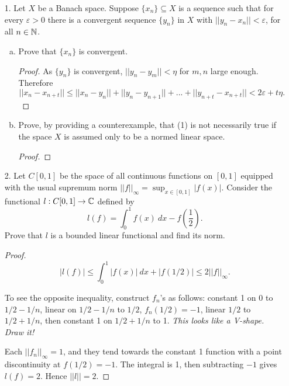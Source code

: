

\begin{itemize}

\item[1.] Let $X$ be a Banach space. Suppose $\{x_n\} \subseteq X$ is a sequence such that for every $\varepsilon > 0$ there is a convergent sequence $\{y_n\}$ in $X$ with $||y_n - x_n|| < \varepsilon$, for all $n \in \mathbb{N}$.
\begin{enumerate}[(a)]
\item Prove that $\{x_n\}$ is convergent.
\begin{proof}
As $\{y_n\}$ is convergent, $||y_n - y_m|| < \eta$ for $m,n$ large enough. Therefore
$$||x_n - x_{n+t}|| \leq ||x_n - y_n|| + ||y_n - y_{n+1}|| + ... + ||y_{n+t} - x_{n+t}|| < 2\varepsilon + t \eta.$$
\end{proof}

\item Prove, by providing a counterexample, that (1) is not necessarily true if the
space $X$ is assumed only to be a normed linear space.
\begin{proof}

\end{proof}
\end{enumerate}






\item[2.] Let $C[0, 1]$ be the space of all continuous functions on $[0, 1]$ equipped
with the usual supremum norm $||f||_{\infty} = \sup_{x \in [0,1]} |f(x)|$. Consider the functional $l : C[0, 1] \rightarrow \mathbb{C}$ defined by
$$l(f) = \int_0^1 f(x) \ dx - f(\frac{1}{2}).$$
Prove that $l$ is a bounded linear functional and find its norm.

\begin{proof}
$$|l(f)| \leq \int_0^1 |f(x)| \ dx + |f(1/2)| \leq 2||f||_{\infty}.$$

\medskip 

To see the opposite inequality, construct $f_n$'s as follows: constant 1 on 0 to $1/2 - 1/n$, linear on $1/2 - 1/n$ to $1/2$, $f_n(1/2) = -1$, linear $1/2$ to $1/2 + 1/n$, then constant 1 on $1/2 + 1/n$ to 1. \textit{This looks like a V-shape. Draw it!}

\medskip 

Each $||f_n||_{\infty} = 1$, and they tend towards the constant 1 function with a point discontinuity at $f(1/2) = -1$. The integral is 1, then subtracting $-1$ gives $l(f) = 2$. Hence $||l|| = 2$.
\end{proof}







\end{itemize}
